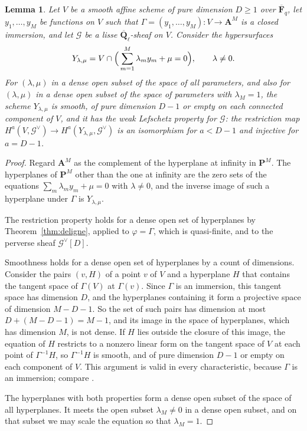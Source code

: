 \documentclass[11pt,a4paper]{article}
\theoremstyle{plain}
\newtheorem{lemma}[theorem]{Lemma}
\theoremstyle{remark}
\newcommand{\Fqb}{\overline{\mathbf F}_q}
\newcommand{\Ql}{\overline{\mathbf Q}_\ell}
\newcommand{\A}{\mathbf A}
\newcommand{\G}{\mathcal G}
\begin{document}
\begin{lemma}\label{lem:good}
Let $V$ be a smooth affine scheme of pure dimension $D\ge1$ over $\Fqb$, let $y_1,\dots,y_M$ be functions on $V$
such that $\Gamma=(y_1,\dots,y_M):V\to\A^M$ is a closed immersion, and let $\G$ be a lisse $\Ql$-sheaf on $V$.
Consider the hypersurfaces
\[
Y_{\lambda,\mu}=V\cap\Bigl(\,\sum_{m=1}^M\lambda_my_m+\mu=0\Bigr),\qquad\lambda\ne0.
\]
For $(\lambda,\mu)$ in a dense open subset of the space of all parameters, and also for $(\lambda,\mu)$ in a dense
open subset of the space of parameters with $\lambda_M=1$, the scheme $Y_{\lambda,\mu}$ is smooth, of pure dimension
$D-1$ or empty on each connected component of $V$, and it has the weak Lefschetz property for $\G$: the restriction
map $H^a(V,\G^\vee)\to H^a(Y_{\lambda,\mu},\G^\vee)$ is an isomorphism for $a<D-1$ and injective for $a=D-1$.
\end{lemma}

\begin{proof}
Regard $\A^M$ as the complement of the hyperplane at infinity in $\mathbf P^M$. The hyperplanes of $\mathbf P^M$
other than the one at infinity are the zero sets of the equations $\sum_m\lambda_my_m+\mu=0$ with $\lambda\ne0$, and
the inverse image of such a hyperplane under $\Gamma$ is $Y_{\lambda,\mu}$.

The restriction property holds for a dense open set of hyperplanes by Theorem~\ref{thm:deligne}, applied to
$\varphi=\Gamma$, which is quasi-finite, and to the perverse sheaf $\G^\vee[D]$.

Smoothness holds for a dense open set of hyperplanes by a count of dimensions. Consider the pairs $(v,H)$ of a point
$v$ of $V$ and a hyperplane $H$ that contains the tangent space of $\Gamma(V)$ at $\Gamma(v)$. Since $\Gamma$ is an
immersion, this tangent space has dimension $D$, and the hyperplanes containing it form a projective space of
dimension $M-D-1$. So the set of such pairs has dimension at most $D+(M-D-1)=M-1$, and its image in the space of
hyperplanes, which has dimension $M$, is not dense. If $H$ lies outside the closure of this image, the equation of
$H$ restricts to a nonzero linear form on the tangent space of $V$ at each point of $\Gamma^{-1}H$, so
$\Gamma^{-1}H$ is smooth, and of pure dimension $D-1$ or empty on each component of $V$. This argument is valid in
every characteristic, because $\Gamma$ is an immersion; compare \cite[I.6.10]{Jouanolou}.

The hyperplanes with both properties form a dense open subset of the space of all hyperplanes. It meets the open
subset $\lambda_M\ne0$ in a dense open subset, and on that subset we may scale the equation so that $\lambda_M=1$.
\end{proof}
\end{document}
